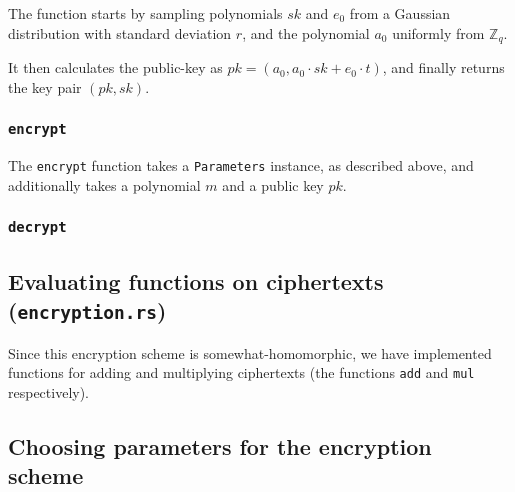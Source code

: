 \documentclass{article}
\begin{document}
The function starts by sampling polynomials $sk$ and $e_0$ from a Gaussian distribution with standard deviation $r$, and the polynomial $a_0$ uniformly from $\mathbb{Z}_q$.

It then calculates the public-key as $pk = (a_0, a_0 \cdot sk + e_0 \cdot t)$, and finally returns the key pair $(pk, sk)$.

\subsubsection{\lstinline{encrypt}}

The \lstinline{encrypt} function takes a \lstinline{Parameters} instance, as described above, and additionally takes a polynomial $m$ and a public key $pk$.

\subsubsection{\lstinline{decrypt}}


\subsection{Evaluating functions on ciphertexts (\lstinline{encryption.rs})}

Since this encryption scheme is somewhat-homomorphic, we have implemented functions for adding and multiplying ciphertexts (the functions \lstinline{add} and \lstinline{mul} respectively).

\subsection{Choosing parameters for the encryption scheme}
\end{document}

